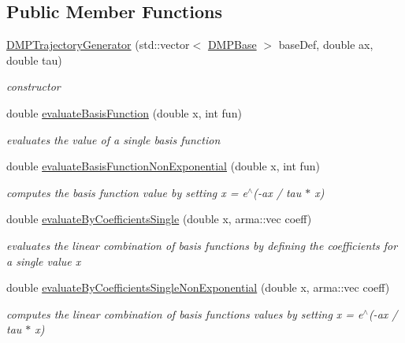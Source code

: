 \subsection*{Public Member Functions}
\begin{DoxyCompactItemize}
\item 
\hyperlink{classkukadu_1_1DMPTrajectoryGenerator_a0bf8fd4b7bc9aded7f0929743228e73a}{D\+M\+P\+Trajectory\+Generator} (std\+::vector$<$ \hyperlink{classkukadu_1_1DMPBase}{D\+M\+P\+Base} $>$ base\+Def, double ax, double tau)
\begin{DoxyCompactList}\small\item\em constructor \end{DoxyCompactList}\item 
double \hyperlink{classkukadu_1_1DMPTrajectoryGenerator_a6072064f086581981d1b1540953d4bd0}{evaluate\+Basis\+Function} (double x, int fun)
\begin{DoxyCompactList}\small\item\em evaluates the value of a single basis function \end{DoxyCompactList}\item 
double \hyperlink{classkukadu_1_1DMPTrajectoryGenerator_ad85bfa03fb1b426b9c808607a22d4f95}{evaluate\+Basis\+Function\+Non\+Exponential} (double x, int fun)
\begin{DoxyCompactList}\small\item\em computes the basis function value by setting x = e$^\wedge$(-\/ax / tau $\ast$ x) \end{DoxyCompactList}\item 
double \hyperlink{classkukadu_1_1DMPTrajectoryGenerator_aa14fb2c9ba08e0a8323090593b46d7f4}{evaluate\+By\+Coefficients\+Single} (double x, arma\+::vec coeff)
\begin{DoxyCompactList}\small\item\em evaluates the linear combination of basis functions by defining the coefficients for a single value x \end{DoxyCompactList}\item 
double \hyperlink{classkukadu_1_1DMPTrajectoryGenerator_a48f050d0bded75b1babaafda54aa0432}{evaluate\+By\+Coefficients\+Single\+Non\+Exponential} (double x, arma\+::vec coeff)
\begin{DoxyCompactList}\small\item\em computes the linear combination of basis functions values by setting x = e$^\wedge$(-\/ax / tau $\ast$ x) \end{DoxyCompactList}\item 

\end{DoxyCompactItemize}
